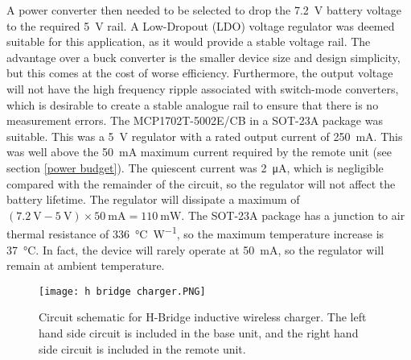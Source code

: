A power converter then needed to be selected to drop the \SI{7.2}{\volt} battery voltage to the required \SI{5}{\volt} rail. A Low-Dropout (LDO) voltage regulator was deemed suitable for this application, as it would provide a stable voltage rail. The advantage over a buck converter is the smaller device size and design simplicity, but this comes at the cost of worse efficiency. Furthermore, the output voltage will not have the high frequency ripple associated with switch-mode converters, which is desirable to create a stable analogue rail to ensure that there is no measurement errors. The MCP1702T-5002E/CB \cite{mcp1702} in a SOT-23A package was suitable. This was a \SI{5}{\volt} regulator with a rated output current of \SI{250}{\milli\ampere}. This was well above the \SI{50}{\milli\ampere} maximum current required by the remote unit (see section \ref{power budget}). The quiescent current was \SI{2}{\micro\ampere}, which is negligible compared with the remainder of the circuit, so the regulator will not affect the battery lifetime. The regulator will dissipate a maximum of $(\SI{7.2}{\volt}-\SI{5}{\volt})\times\SI{50}{\milli\ampere}=\SI{110}{\milli\watt}$. The SOT-23A package has a junction to air thermal resistance of \SI{336}{\celsius\per\watt}, so the maximum temperature increase is \SI{37}{\celsius}. In fact, the device will rarely operate at \SI{50}{\milli\ampere}, so the regulator will remain at ambient temperature.\\

\begin{figure}[htbp]
	\centering
	\texttt{[image: h bridge charger.PNG]}
	\caption{Circuit schematic for H-Bridge inductive wireless charger. The left hand side circuit is included in the base unit, and the right hand side circuit is included in the remote unit.}
	\label{fig: charger schematic}
\end{figure}
	

